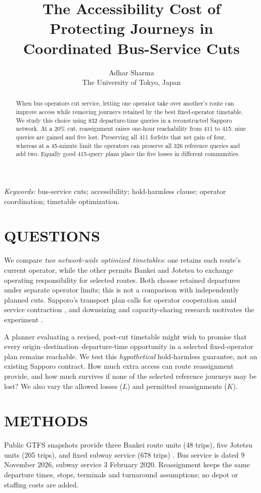 \documentclass[11pt]{article}
\title{The Accessibility Cost of Protecting Journeys in Coordinated Bus-Service Cuts}
\author{Adhar Sharma\\[2pt]\small The University of Tokyo, Japan}
\date{}
\begin{document}
\maketitle
\begin{abstract}
When bus operators cut service, letting one operator take over another's route can improve access while removing journeys retained by the best fixed-operator timetable. We study this choice using 832 departure-time queries in a reconstructed Sapporo network. At a 20\% cut, reassignment raises one-hour reachability from 411 to 415: nine queries are gained and five lost. Preserving all 411 forfeits that net gain of four, whereas at a 45-minute limit the operators can preserve all 326 reference queries and add two. Equally good 415-query plans place the five losses in different communities.
\end{abstract}
\textit{Keywords:} bus-service cuts; accessibility; hold-harmless clause; operator coordination; timetable optimization.

\section{QUESTIONS}
We compare \emph{two network-wide optimized timetables}: one retains each route's current operator, while the other permits Bankei and Jotetsu to exchange operating responsibility for selected routes. Both choose retained departures under separate operator limits; this is not a comparison with independently planned cuts. Sapporo's transport plan calls for operator cooperation amid service contraction \citep{sapporoPlan2024}, and downsizing and capacity-sharing research motivates the experiment \citep{guillot2022,pantelidis2024}.

A planner evaluating a revised, post-cut timetable might wish to promise that every origin--destination--departure-time opportunity in a selected fixed-operator plan remains reachable. We test this \emph{hypothetical} hold-harmless guarantee, not an existing Sapporo contract. How much extra access can route reassignment provide, and how much survives if none of the selected reference journeys may be lost? We also vary the allowed losses ($L$) and permitted reassignments ($K$).

\section{METHODS}
Public GTFS snapshots provide three Bankei route units (48 trips), five Jotetsu units (205 trips), and fixed subway service (678 trips) \citep{bankeiGTFS,jotetsuGTFS,subwayGTFS}. Bus service is dated 9 November 2026, subway service 3 February 2020. Reassignment keeps the same departure times, stops, terminals and turnaround assumptions; no depot or staffing costs are added.
\end{document}
